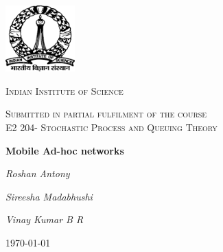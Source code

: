 \documentclass[a4paper,10pt,english]{article}
\begin{document}
\begin{titlepage}
	\centering
	\includegraphics[width=0.2\textwidth]{images.png}\par\vspace{1cm}
	{\scshape\LARGE Indian Institute of Science \par}
	\vspace{1cm}
	{\scshape\Large Submitted in partial fulfilment of the course \\ E2 204- Stochastic Process and Queuing Theory\par}
	\vspace{1.5cm}
	{\huge\bfseries Mobile Ad-hoc networks\par}
	\vspace{2cm}
	{\Large\itshape Roshan Antony\par}
		{\Large\itshape Sireesha Madabhushi\par}
			{\Large\itshape Vinay Kumar B R\par}
	\vfill
	
	{\large \today\par}
\end{titlepage}
\tableofcontents
\end{document}
